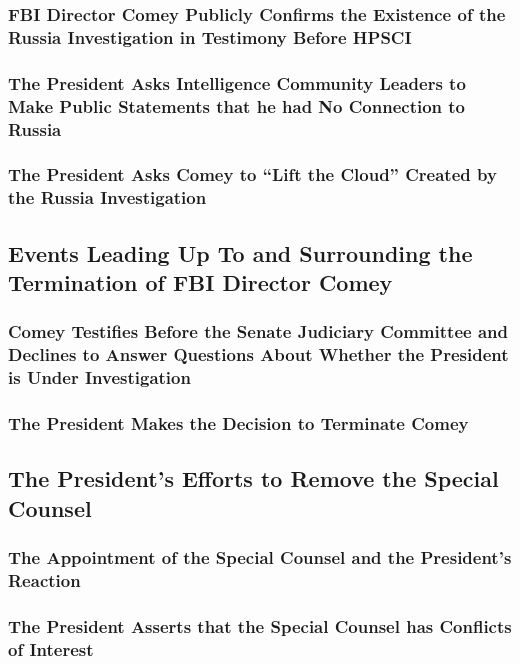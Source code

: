\subsubsection{FBI Director Comey Publicly Confirms the Existence of the Russia Investigation in Testimony Before HPSCI}

\subsubsection{The President Asks Intelligence Community Leaders to Make Public Statements that he had No Connection to Russia}

\subsubsection{The President Asks Comey to “Lift the Cloud” Created by the Russia Investigation}

\subsection{Events Leading Up To and Surrounding the Termination of FBI Director Comey}

\subsubsection{Comey Testifies Before the Senate Judiciary Committee and Declines to Answer Questions About Whether the President is Under Investigation}

\subsubsection{The President Makes the Decision to Terminate Comey}

\subsection{The President’s Efforts to Remove the Special Counsel}

\subsubsection{The Appointment of the Special Counsel and the President’s Reaction}

\subsubsection{The President Asserts that the Special Counsel has Conflicts of Interest}

